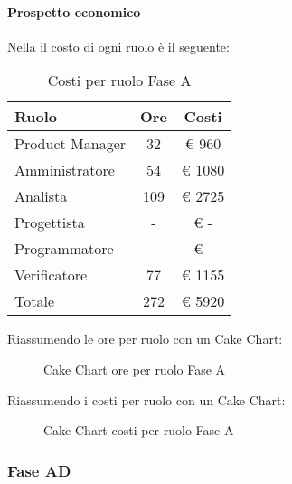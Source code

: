 			\paragraph{Prospetto economico}
				Nella  il costo di ogni ruolo è il seguente:
				\begin{table}
					\begin{center}
						\begin{tabular}{| l | c | c |}
							\hline
							Ruolo 			& Ore 	& Costi  \\ \hline
							
							Product Manager	& 32 		& \euro{} 960 	\\
							Amministratore 		& 54 		& \euro{} 1080 	\\
							Analista	 		& 109 		& \euro{} 2725 	\\
							Progettista 		& - 		& \euro{} -  	\\
							Programmatore		& - 		& \euro{} - 	\\
							Verificatore		& 77 		& \euro{} 1155 	\\ \hline \hline
							
							Totale	 		& 272 		& \euro{} 5920 	\\ \hline
						\end{tabular}
					\end{center}
					\caption{Costi per ruolo Fase A}
				\end{table}
				Riassumendo le ore per ruolo con un Cake Chart:
				\begin{figure}\centering
					\caption{Cake Chart ore per ruolo Fase A}
				\end{figure}
				Riassumendo i costi per ruolo con un Cake Chart:
				\begin{figure}\centering
					\caption{Cake Chart costi per ruolo Fase A}
				\end{figure}
		\subsubsection{Fase AD}
